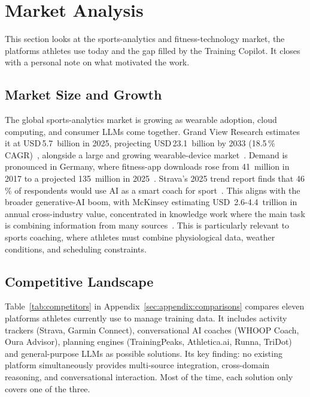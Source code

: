 \section{Market Analysis}\label{sec:market}

This section looks at the sports-analytics and fitness-technology market, the platforms athletes use today and the gap filled by the Training Copilot. It closes with a personal note on what motivated the work.

\subsection{Market Size and Growth}\label{sec:market:size}

The global sports-analytics market is growing as wearable adoption, cloud computing, and consumer LLMs come together. Grand View Research estimates it at USD\,5.7~billion in 2025, projecting USD\,23.1~billion by 2033 (18.5\,\% CAGR)~\citep{grandview_sports_2024}, alongside a large and growing wearable-device market~\citep{idc_wearables_2024}. Demand is pronounced in Germany, where fitness-app downloads rose from 41~million in 2017 to a projected 135~million in 2025~\citep{statista_fitness_apps_2025}. Strava's 2025 trend report finds that 46\,\% of respondents would use AI as a smart coach for sport~\citep{strava_trends_2025}. This aligns with the broader generative-AI boom, with McKinsey estimating USD~2.6-4.4~trillion in annual cross-industry value, concentrated in knowledge work where the main task is combining information from many sources~\citep{mckinsey_genai_2023}. This is particularly relevant to sports coaching, where athletes must combine physiological data, weather conditions, and scheduling constraints.

\subsection{Competitive Landscape}\label{sec:market:landscape}

Table~\ref{tab:competitors} in Appendix~\ref{sec:appendix:comparisons} compares eleven platforms athletes currently use to manage training data. It includes activity trackers (Strava, Garmin Connect),  conversational AI coaches (WHOOP Coach, Oura Advisor), planning engines (TrainingPeaks, Athletica.ai, Runna, TriDot) and general-purpose LLMs as possible solutions. Its key finding: no existing platform simultaneously provides multi-source integration, cross-domain reasoning, and conversational interaction. Most of the time, each solution only covers one of the three.

